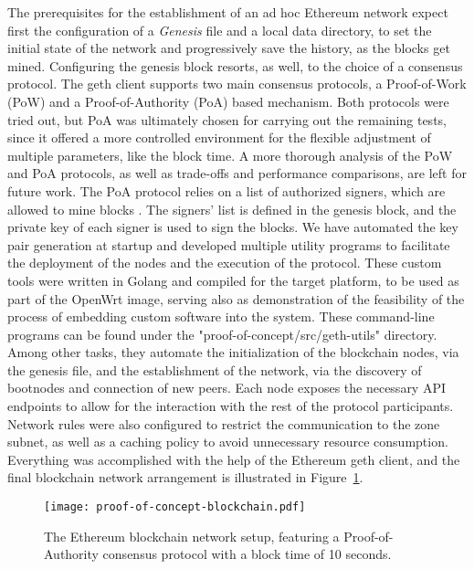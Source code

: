 The prerequisites for the establishment of an ad hoc Ethereum network expect first the configuration of a \emph{Genesis} file and a local data directory, to set the initial state of the network and progressively save the history, as the blocks get mined. Configuring the genesis block resorts, as well, to the choice of a consensus protocol. The geth client supports two main consensus protocols, a Proof-of-Work (PoW) and a Proof-of-Authority (PoA) based mechanism. Both protocols were tried out, but PoA was ultimately chosen for carrying out the remaining tests, since it offered a more controlled environment for the flexible adjustment of multiple parameters, like the block time. A more thorough analysis of the PoW and PoA protocols, as well as trade-offs and performance comparisons, are left for future work. The PoA protocol relies on a list of authorized signers, which are allowed to mine blocks \cite{clique-eth}. The signers' list is defined in the genesis block, and the private key of each signer is used to sign the blocks. We have automated the key pair generation at startup and developed multiple utility programs to facilitate the deployment of the nodes and the execution of the protocol. These custom tools were written in Golang and compiled for the target platform, to be used as part of the OpenWrt image, serving also as demonstration of the feasibility of the process of embedding custom software into the system. These command-line programs can be found under the "proof-of-concept/src/geth-utils" directory. Among other tasks, they automate the initialization of the blockchain nodes, via the genesis file, and the establishment of the network, via the discovery of bootnodes and connection of new peers. Each node exposes the necessary API endpoints to allow for the interaction with the rest of the protocol participants. Network rules were also configured to restrict the communication to the zone subnet, as well as a caching policy to avoid unnecessary resource consumption. Everything was accomplished with the help of the Ethereum geth client, and the final blockchain network arrangement is illustrated in Figure~\ref{fig:pol-implementation:blockchain-network}.

\begin{figure}[h!]
    \begin{center}
    \texttt{[image: proof-of-concept-blockchain.pdf]}
    \caption{The Ethereum blockchain network setup, featuring a Proof-of-Authority consensus protocol with a block time of 10 seconds.}
    \label{fig:pol-implementation:blockchain-network}
    \end{center}
\end{figure}


